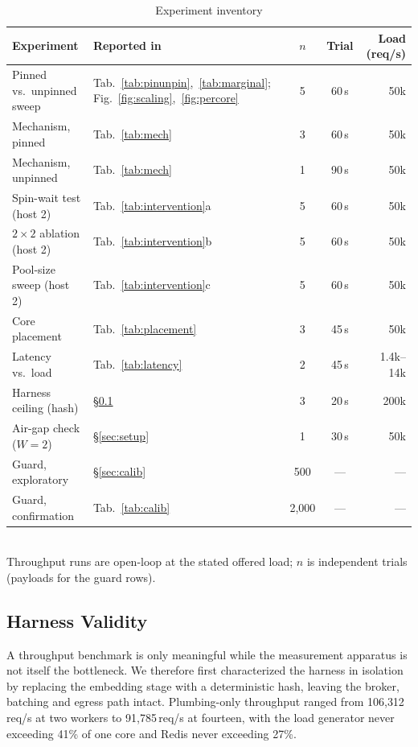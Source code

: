 \documentclass[conference]{IEEEtran}
\begin{document}
\begin{table}[t]
\caption{Experiment inventory}
\label{tab:inventory}
\centering\footnotesize\setlength{\tabcolsep}{2pt}
\begin{tabular}{@{}llccr@{}}
\toprule
Experiment & Reported in & $n$ & Trial & Load (req/s) \\
\midrule
Pinned vs.\ unpinned sweep & Tab.~\ref{tab:pinunpin},~\ref{tab:marginal}; Fig.~\ref{fig:scaling},~\ref{fig:percore} & 5 & 60\,s & 50k \\
Mechanism, pinned & Tab.~\ref{tab:mech} & 3 & 60\,s & 50k \\
Mechanism, unpinned & Tab.~\ref{tab:mech} & 1 & 90\,s & 50k \\
Spin-wait test (host 2) & Tab.~\ref{tab:intervention}a & 5 & 60\,s & 50k \\
$2\times2$ ablation (host 2) & Tab.~\ref{tab:intervention}b & 5 & 60\,s & 50k \\
Pool-size sweep (host 2) & Tab.~\ref{tab:intervention}c & 5 & 60\,s & 50k \\
Core placement & Tab.~\ref{tab:placement} & 3 & 45\,s & 50k \\
Latency vs.\ load & Tab.~\ref{tab:latency} & 2 & 45\,s & 1.4k--14k \\
Harness ceiling (hash) & \S\ref{sec:harness} & 3 & 20\,s & 200k \\
Air-gap check ($W{=}2$) & \S\ref{sec:setup} & 1 & 30\,s & 50k \\
Guard, exploratory & \S\ref{sec:calib} & 500 & --- & --- \\
Guard, confirmation & Tab.~\ref{tab:calib} & 2{,}000 & --- & --- \\
\bottomrule
\end{tabular}
\\[2pt]\footnotesize Throughput runs are open-loop at the stated offered load; $n$ is independent trials (payloads for the guard rows).
\end{table}

\subsection{Harness Validity}
\label{sec:harness}

A throughput benchmark is only meaningful while the measurement apparatus is not itself the bottleneck. We therefore first characterized the harness in isolation by replacing the embedding stage with a deterministic hash, leaving the broker, batching and egress path intact. Plumbing-only throughput ranged from 106{,}312\,req/s at two workers to 91{,}785\,req/s at fourteen, with the load generator never exceeding 41\% of one core and Redis never exceeding 27\%.
\end{document}
